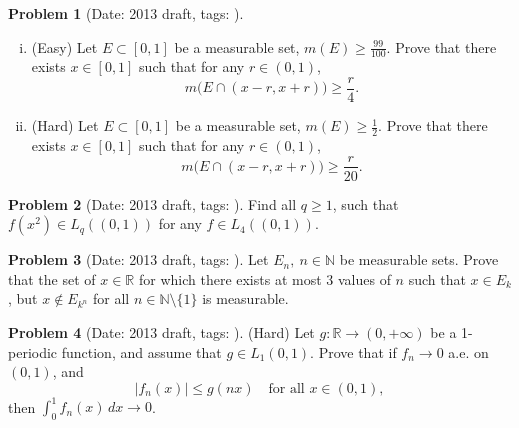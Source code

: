 \documentclass[11pt, notitlepage]{article}
\theoremstyle{definition}
\theoremstyle{definition}
\theoremstyle{definition}
\newtheorem{probstate}{Problem}
\theoremstyle{remark}
\newenvironment{problem}[2]{
    \begin{probstate}[Date: #1, tags: \texttt{#2}]
}
{
  \end{probstate}
}
\newcommand{\R}{\mathbb{R}}
\newcommand{\N}{\mathbb{N}}
\begin{document}
\begin{problem}{2013 draft}{}
\begin{enumerate}[(i)]
   \item (Easy) Let $E \subset [0,1]$ be a measurable set, $m(E) \ge \frac{99}{100}$. Prove that there exists $x \in [0,1]$ such that for any $r \in (0,1)$,
    \[
      m \big( E \cap (x-r,x+r) \big) \ge \frac{r}{4}.
    \]
    \item (Hard) Let $E \subset [0,1]$ be a measurable set, $m(E) \ge \frac{1}{2}$. Prove that there exists $x \in [0,1]$ such that for any $r \in (0,1)$,
    \[
      m \big(E \cap (x-r,x+r) \big) \ge \frac{r}{20}.
    \]
\end{enumerate}
\end{problem}

\begin{problem}{2013 draft}{}
Find all $q \ge 1$, such that $f(x^2) \in L_q((0,1))$ for any $f  \in L_4((0,1))$.
\end{problem}

\begin{problem}{2013 draft}{}
Let $E_n, \ n \in \N$ be measurable sets. Prove that the set of $x \in \R$ for which there exists at most 3 values of $n$ such that $x \in E_k$, but $x \notin E_{k^n}$ for all $n \in \N \setminus \{1\}$ is measurable.
\end{problem}

\begin{problem}{2013 draft}{}
(Hard) Let $g: \R \to (0,+\infty)$ be a 1-periodic function, and assume that $g \in L_1(0,1)$. Prove that if $f_n \to 0$ a.e. on $(0,1)$, and
    \[
     |f_n(x)| \le g(nx) \quad \text{for all } x \in (0,1),
    \]
    then $\int_0^1f_n (x) \, dx \to 0$.
\end{problem}
\end{document}
